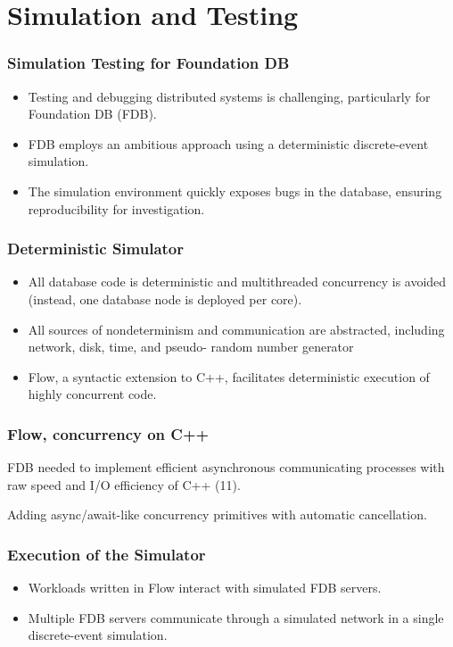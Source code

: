 \section{Simulation and Testing }

\begin{frame}
    \frametitle{Simulation Testing for Foundation DB}
    \begin{itemize}
        \item Testing and debugging distributed systems is challenging, particularly for Foundation DB (FDB).
        \item FDB employs an ambitious approach using a deterministic discrete-event simulation.
        \item The simulation environment quickly exposes bugs in the database, ensuring reproducibility for investigation.
    \end{itemize}
\end{frame}
\begin{frame}
    \frametitle{Deterministic Simulator}
    \begin{itemize}
        \item All database
code is deterministic and multithreaded concurrency is
avoided (instead, one database node is deployed per core).
        \item All sources of nondeterminism and communication are
abstracted, including network, disk, time, and pseudo-
random number generator
        \item Flow, a syntactic extension to C++, facilitates deterministic execution of highly concurrent code.
    \end{itemize}
\end{frame}

\begin{frame}
    \frametitle{Flow, concurrency on C++}
   FDB needed to implement efficient asynchronous communicating processes with raw speed and I/O efficiency of C++ (11).
\vspace{0.5cm}

Adding async/await-like
concurrency primitives with automatic cancellation.

   
\end{frame}

\begin{frame}
    \frametitle{Execution of the Simulator}
    \begin{itemize}
        \item Workloads written in Flow interact with simulated FDB servers.
        \item Multiple FDB servers communicate through a simulated network in a single discrete-event simulation.
    \end{itemize}
\end{frame}

